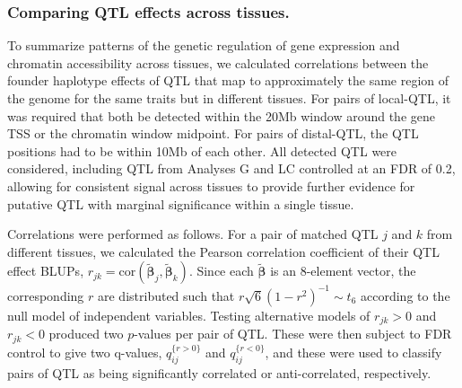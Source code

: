\documentclass[9pt,twocolumn,twoside]{gsajnl}
\newcommand{\bbeta}{\boldsymbol{\beta}}
\newcommand{\blup}{\widetilde{\bbeta}}
\newcommand{\bzero}{\mathbf{0}}
\newcommand{\bI}{\mathbf{I}}
\newcommand{\bx}{\mathbf{x}}
\newcommand{\tausq}{\tau^{2}}
\begin{document}

\subsubsection{Comparing QTL effects across tissues.}

To summarize patterns of the genetic regulation of gene expression and chromatin accessibility across tissues, we calculated correlations between the founder haplotype effects of QTL that map to approximately the same region of the genome for the same traits but in different tissues. For pairs of local-QTL, it was required that both be detected within the 20Mb window around the gene TSS or the chromatin window midpoint. For pairs of distal-QTL, the QTL positions had to be within 10Mb of each other. All detected QTL were considered, including QTL from Analyses G and LC controlled at an FDR of 0.2, allowing for consistent signal across tissues to provide further evidence for putative QTL with marginal significance within a single tissue.

Correlations were performed as follows. For a pair of matched QTL $j$ and $k$ from different tissues, we calculated the Pearson correlation coefficient of their QTL effect BLUPs, $r_{jk} = \text{cor}(\blup_j, \blup_k)$. Since each $\blup$ is an 8-element vector, the corresponding $r$ are distributed such that $r\sqrt{6}(1 - r^{2})^{-1} \sim t_{6}$ according to the null model of independent variables. Testing alternative models of $r_{jk} > 0$ and $r_{jk} < 0$ produced two $p$-values per pair of QTL. These were then subject to FDR control \citep{Benjamini1995} to give two q-values, $q_{ij}^{\{r > 0\}}$ and $q_{ij}^{\{r < 0\}}$, and these were used to classify pairs of QTL as being significantly correlated or anti-correlated, respectively. 
\end{document}
